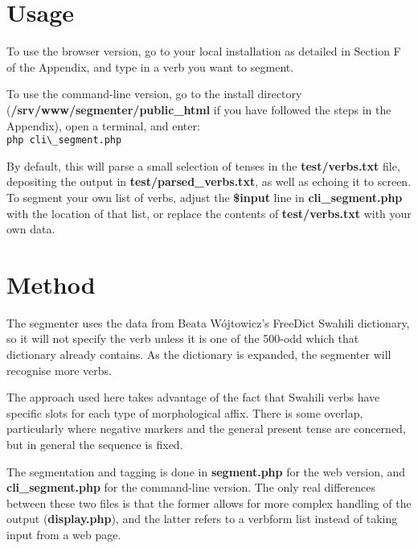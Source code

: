 \documentclass[a4paper,10pt]{article}
\begin{document}
\section{Usage}

To use the browser version, go to your local installation as detailed in Section F of the Appendix, and type in a verb you want to segment.

To use the command-line version, go to the install directory (\textbf{/srv/www/seg\-menter/public\_html} if you have followed the steps in the Appendix), open a terminal, and enter:\\
\verb|php cli\_segment.php|

By default, this will parse a small selection of tenses in the \textbf{test/verbs.txt} file, depositing the output in \textbf{test/parsed\_verbs.txt}, as well as echoing it to screen.  To segment your own list of verbs, adjust the \textbf{\$input} line in \textbf{cli\_segment.php} with the location of that list, or replace the contents of \textbf{test/verbs.txt} with your own data.

\section{Method}

The segmenter uses the data from Beata Wójtowicz's FreeDict Swahili dictionary, so it will not specify the verb unless it is one of the 500-odd which that dictionary already contains. As the dictionary is expanded, the segmenter will recognise more verbs.

The approach used here takes advantage of the fact that Swahili verbs have specific slots for each type of morphological affix. There is some overlap, particularly where negative markers and the general present tense are concerned, but in general the sequence is fixed.

The segmentation and tagging is done in \textbf{segment.php} for the web version, and \textbf{cli\_segment.php} for the command-line version.  The only real differences between these two files is that the former allows for more complex handling of the output (\textbf{display.php}), and the latter refers to a verbform list instead of taking input from a web page.
\end{document}
